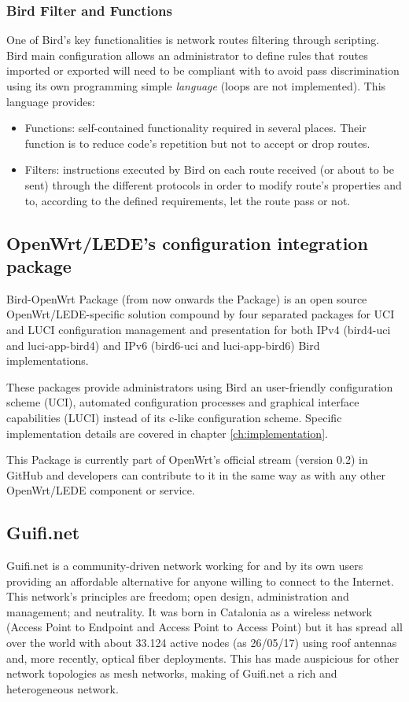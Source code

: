 \subsubsection{Bird Filter and Functions}
\label{sub:sub:filfun}
One of Bird's key functionalities is network routes filtering through scripting. Bird main configuration allows an administrator to define rules that routes imported or exported will need to be compliant with to avoid pass discrimination using its own programming simple \textit{language} (loops are not implemented). This language provides:
\begin{itemize}
    \item Functions: self-contained functionality required in several places. Their function is to reduce code's repetition but not to accept or drop routes.
    \item Filters: instructions executed by Bird on each route received (or about to be sent) through the different protocols in order to modify route's properties and to, according to the defined requirements, let the route pass or not.     
\end{itemize} 

\subsection{OpenWrt/LEDE's configuration integration package}
Bird-OpenWrt Package (from now onwards the Package) is an open source OpenWrt/LEDE-specific solution compound by four separated packages for UCI and LUCI configuration management and presentation for both IPv4 (bird4-uci and luci-app-bird4) and IPv6 (bird6-uci and luci-app-bird6) Bird implementations.

These packages provide administrators using Bird an user-friendly configuration scheme (UCI), automated configuration processes and graphical interface capabilities (LUCI) instead of its c-like configuration scheme. Specific implementation details are covered in chapter \ref{ch:implementation}.

This Package is currently part of OpenWrt's official stream (version 0.2) in GitHub and developers can contribute to it in the same way as with any other OpenWrt/LEDE component or service.

\subsection{Guifi.net}
\label{subsec:gn}
Guifi.net is a community-driven network working for and by its own users providing an affordable alternative for anyone willing to connect to the Internet. This network's principles are freedom; open design, administration and management; and neutrality. It was born in Catalonia as a wireless network (Access Point to Endpoint and Access Point to Access Point) but it has spread all over the world with about 33.124 active nodes (as 26/05/17) using roof antennas and, more recently, optical fiber deployments. This has made auspicious for other network topologies as mesh networks, making of Guifi.net a rich and heterogeneous network.

